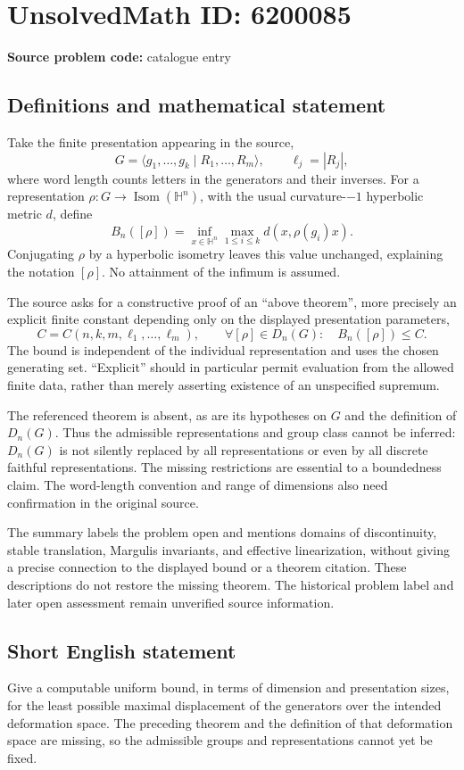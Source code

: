 \documentclass[11pt]{article}
\begin{document}
\section*{UnsolvedMath ID: 6200085}
\textbf{Source problem code:} catalogue entry
\subsection{Definitions and mathematical statement}
Take the finite presentation appearing in the source,
\[
 G=\langle g_1,\ldots,g_k\mid R_1,\ldots,R_m\rangle,
 \qquad \ell_j=|R_j|,
\]
where word length counts letters in the generators and their inverses. For a representation \(\rho:G\to\operatorname{Isom}(\mathbb H^n)\), with the usual curvature-\(-1\) hyperbolic metric \(d\), define
\[
 B_n([\rho])=\inf_{x\in\mathbb H^n}\max_{1\le i\le k}
 d(x,\rho(g_i)x).
\]
Conjugating \(\rho\) by a hyperbolic isometry leaves this value unchanged, explaining the notation \([\rho]\). No attainment of the infimum is assumed.

The source asks for a constructive proof of an ``above theorem'', more precisely an explicit finite constant depending only on the displayed presentation parameters,
\[
 C=C(n,k,m,\ell_1,\ldots,\ell_m),\qquad
 \forall[\rho]\in D_n(G):\quad B_n([\rho])\le C.
\]
The bound is independent of the individual representation and uses the chosen generating set. ``Explicit'' should in particular permit evaluation from the allowed finite data, rather than merely asserting existence of an unspecified supremum.

The referenced theorem is absent, as are its hypotheses on \(G\) and the definition of \(D_n(G)\). Thus the admissible representations and group class cannot be inferred: \(D_n(G)\) is not silently replaced by all representations or even by all discrete faithful representations. The missing restrictions are essential to a boundedness claim. The word-length convention and range of dimensions also need confirmation in the original source.

The summary labels the problem open and mentions domains of discontinuity, stable translation, Margulis invariants, and effective linearization, without giving a precise connection to the displayed bound or a theorem citation. These descriptions do not restore the missing theorem. The historical problem label and later open assessment remain unverified source information.
\subsection{Short English statement}
Give a computable uniform bound, in terms of dimension and presentation sizes, for the least possible maximal displacement of the generators over the intended deformation space. The preceding theorem and the definition of that deformation space are missing, so the admissible groups and representations cannot yet be fixed.
\end{document}

